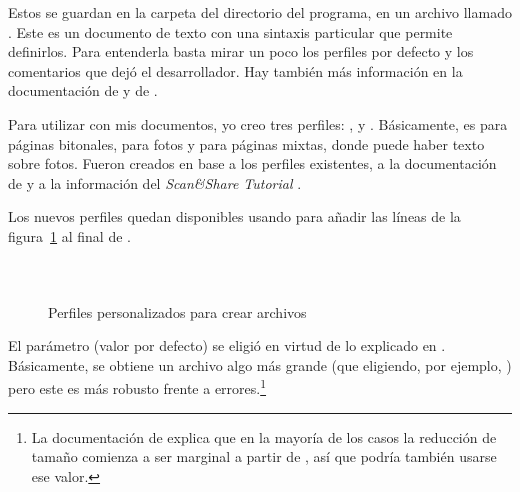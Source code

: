 \documentclass[%
	a5paper,
	10pt,
	twoside,
	openright,
	final,
]{memoir}
\begin{document}
	Estos se guardan en la carpeta  del directorio del programa, en un archivo llamado . Este es un documento de texto con una sintaxis particular que permite definirlos. Para entenderla basta mirar un poco los perfiles por defecto y los comentarios que dejó el desarrollador. Hay también más información en la documentación de \dexpress y de \djvusmallmod.

	Para utilizar con mis documentos, yo creo tres perfiles: ,  y . Básicamente,  es para páginas bitonales,  para fotos y  para páginas mixtas, donde puede haber texto sobre fotos. Fueron creados en base a los perfiles existentes, a la documentación de \dexpress y a la información del \emph{Scan\&Share Tutorial} \cite{ScanAndShare2008}.

	Los nuevos perfiles quedan disponibles usando \notepad para añadir las líneas de la figura~\ref{fig:djvuProfiles} al final de .

	\begin{figure}
		\begin{minipage}{\linewidth}
			\inputminted[bgcolor=bg]{c}{scripts/MyBitonal.profile}
			\vspace{-\baselineskip}
		\end{minipage}\vspace{\baselineskip}
		\begin{minipage}{\linewidth}
			\inputminted[bgcolor=bg]{c}{scripts/MyPhoto.profile}
			\vspace{-\baselineskip}
		\end{minipage}\vspace{\baselineskip}
		\begin{minipage}{\linewidth}
			\inputminted[bgcolor=bg]{c}{scripts/MyScan.profile}
			\vspace{-\baselineskip}
		\end{minipage}\vspace{\baselineskip}
		\caption{Perfiles personalizados para crear archivos \djvu\label{fig:djvuProfiles}}
	\end{figure}

	El parámetro  (valor por defecto) se eligió en virtud de lo explicado en \cite{DjVuDictionarySize}. Básicamente, se obtiene un archivo algo más grande (que eligiendo, por ejemplo, ) pero este es más robusto frente a errores.\footnote{La documentación de \dexpress explica que en la mayoría de los casos la reducción de tamaño comienza a ser marginal a partir de , así que podría también usarse ese valor.}
\end{document}
